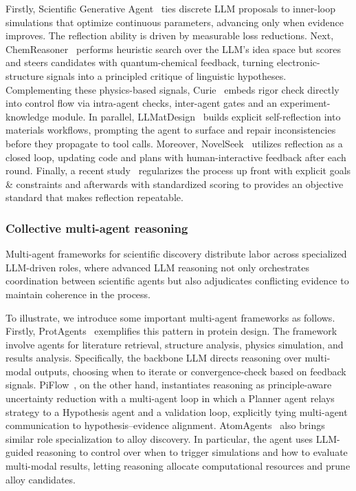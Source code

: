 Firstly, Scientific Generative Agent~\cite{ma2024llmsimulationbileveloptimizers} ties discrete LLM proposals to inner-loop simulations that optimize continuous parameters, advancing only when evidence improves. The reflection ability is driven by measurable loss reductions. Next, ChemReasoner~\cite{sprueill2024chemreasoner} performs heuristic search over the LLM’s idea space but scores and steers candidates with quantum-chemical feedback, turning electronic-structure signals into a principled critique of linguistic hypotheses. Complementing these physics-based signals, Curie~\cite{kon2025curierigorousautomatedscientific} embeds rigor check directly into control flow via intra-agent checks, inter-agent gates and an experiment-knowledge module. In parallel, LLMatDesign~\cite{jia2024llmatdesignautonomousmaterialsdiscovery} builds explicit self-reflection into materials workflows, prompting the agent to surface and repair inconsistencies before they propagate to tool calls. Moreover, NovelSeek~\cite{novelseekteam2025novelseekagentscientist} utilizes reflection as a closed loop, updating code and plans with human-interactive feedback after each round. Finally, a recent study~\cite{kumbhar2025hypothesisgenerationmaterialsdiscovery} regularizes the process up front with explicit goals \& constraints and afterwards with standardized scoring to provides an objective standard that makes reflection repeatable.



\subsubsection{Collective multi-agent reasoning}
\label{sec:app-science-multi}



Multi-agent frameworks for scientific discovery distribute labor across specialized LLM-driven roles, where advanced LLM reasoning not only orchestrates coordination between scientific agents but also adjudicates conflicting evidence to maintain coherence in the process. 

To illustrate, we introduce some important multi-agent frameworks as follows. Firstly, ProtAgents~\cite{ghafarollahi2024protagents} exemplifies this pattern in protein design. The framework involve agents for literature retrieval, structure analysis, physics simulation, and results analysis. Specifically, the backbone LLM directs reasoning over multi-modal outputs, choosing when to iterate or convergence-check based on feedback signals. PiFlow~\cite{pu2025piflow}, on the other hand, instantiates reasoning as principle-aware uncertainty reduction with a multi-agent loop in which a Planner agent relays strategy to a Hypothesis agent and a validation loop, explicitly tying multi-agent communication to hypothesis–evidence alignment.  AtomAgents~\cite{ghafarollahi2024atomagentsalloydesigndiscovery} also brings similar role specialization to alloy discovery. In particular, the agent uses LLM-guided reasoning to control over when to trigger simulations and how to evaluate multi-modal results, letting reasoning allocate computational resources and prune alloy candidates.




